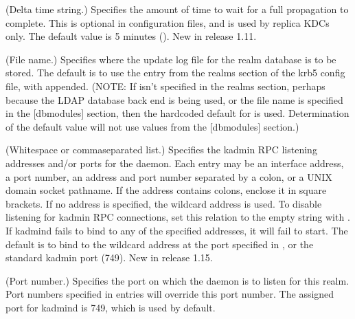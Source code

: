 \documentclass[letterpaper,10pt,english]{sphinxmanual}
\begin{document}
\begin{description}
\sphinxAtStartPar
(Delta time string.)  Specifies the amount of time to wait for a
full propagation to complete.  This is optional in configuration
files, and is used by replica KDCs only.  The default value is 5
minutes ().  New in release 1.11.

\sphinxAtStartPar
(File name.)  Specifies where the update log file for the realm
database is to be stored.  The default is to use the
 entry from the realms section of the krb5 config
file, with  appended.  (NOTE: If  isn’t
specified in the realms section, perhaps because the LDAP database
back end is being used, or the file name is specified in the
{[}dbmodules{]} section, then the hard\sphinxhyphen{}coded default for
 is used.  Determination of the 
default value will not use values from the {[}dbmodules{]} section.)

\sphinxAtStartPar
(Whitespace\sphinxhyphen{} or comma\sphinxhyphen{}separated list.)  Specifies the kadmin RPC
listening addresses and/or ports for the {\hyperref[\detokenize{admin/admin_commands/kadmind:kadmind-8}]{}} daemon.
Each entry may be an interface address, a port number, an address
and port number separated by a colon, or a UNIX domain socket
pathname.  If the address contains colons, enclose it in square
brackets.  If no address is specified, the wildcard address is
used.  To disable listening for kadmin RPC connections, set this
relation to the empty string with .  If
kadmind fails to bind to any of the specified addresses, it will
fail to start.  The default is to bind to the wildcard address at
the port specified in , or the standard kadmin
port (749).  New in release 1.15.

\sphinxAtStartPar
(Port number.)  Specifies the port on which the {\hyperref[\detokenize{admin/admin_commands/kadmind:kadmind-8}]{}}
daemon is to listen for this realm.  Port numbers specified in
 entries will override this port number.  The
assigned port for kadmind is 749, which is used by default.


\end{description}
\end{document}

